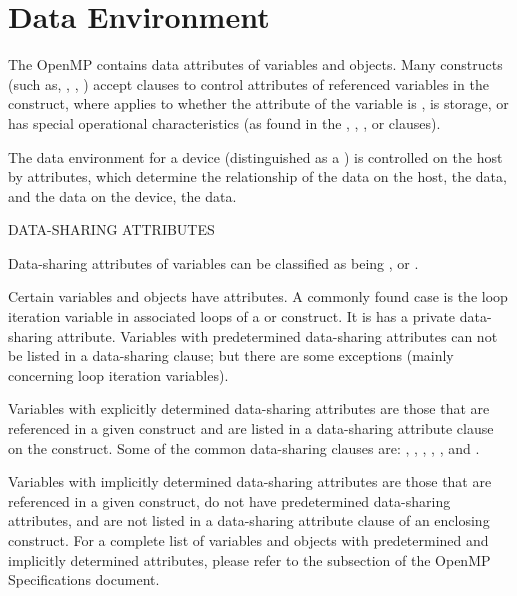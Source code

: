 \pagebreak
\chapter{Data Environment}
\label{chap:data_environment}
The OpenMP  contains data attributes of variables and
objects.  Many constructs (such as, , , ) 
accept clauses to control  attributes
of referenced variables in the construct, where  applies to
whether the attribute of the variable is , 
is  storage, or has special operational characteristics 
(as found in the , , , or  clauses).

The data environment for a device (distinguished as a )
is controlled on the host by  attributes, which determine the
relationship of the data on the host, the  data, and the data on the
device, the  data.

DATA-SHARING ATTRIBUTES

Data-sharing attributes of variables can be classified as being ,
 or .

Certain variables and objects have  attributes.  
A commonly found case is the loop iteration variable in associated loops 
of a  or  construct. It is has a private data-sharing attribute.
Variables with predetermined data-sharing attributes can not be listed in a data-sharing clause; but there are some
exceptions (mainly concerning loop iteration variables).

Variables with explicitly determined data-sharing attributes are those that are
referenced in a given construct and are listed in a data-sharing attribute
clause on the construct. Some of the common data-sharing clauses are:
, , , , 
, and . %

Variables with implicitly determined data-sharing attributes are those
that are referenced in a given construct, do not have predetermined
data-sharing attributes, and are not listed in a data-sharing
attribute clause of an enclosing construct.
For a complete list of variables and objects with predetermined and
implicitly determined attributes, please refer to the
subsection of the OpenMP Specifications document.  

